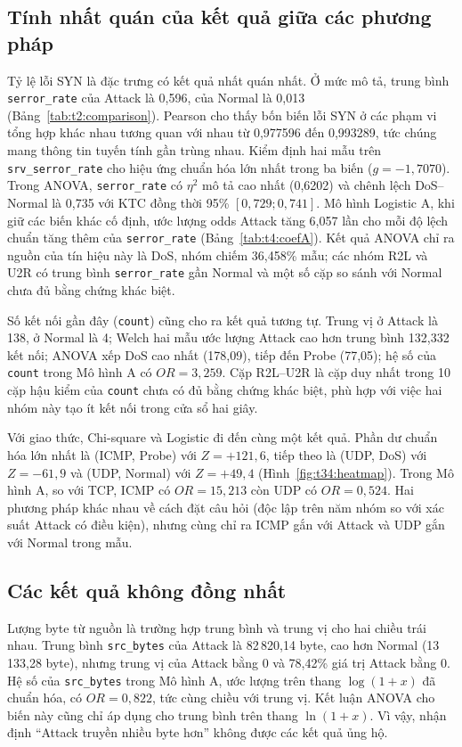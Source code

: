 \documentclass[../main.tex]{subfiles}
\begin{document}
\subsection{Tính nhất quán của kết quả giữa các phương pháp}
Tỷ lệ lỗi SYN là đặc trưng có kết quả nhất quán nhất. Ở mức mô tả, trung bình \texttt{serror\_rate} của Attack là 0,596, của Normal là 0,013 (Bảng~\ref{tab:t2:comparison}). Pearson cho thấy bốn biến lỗi SYN ở các phạm vi tổng hợp khác nhau tương quan với nhau từ 0,977596 đến 0,993289, tức chúng mang thông tin tuyến tính gần trùng nhau. Kiểm định hai mẫu trên \texttt{srv\_serror\_rate} cho hiệu ứng chuẩn hóa lớn nhất trong ba biến ($g=-1{,}7070$). Trong ANOVA, \texttt{serror\_rate} có $\eta^2$ mô tả cao nhất (0,6202) và chênh lệch DoS--Normal là 0,735 với KTC đồng thời 95\% $[0{,}729;0{,}741]$. Mô hình Logistic A, khi giữ các biến khác cố định, ước lượng odds Attack tăng 6,057 lần cho mỗi độ lệch chuẩn tăng thêm của \texttt{serror\_rate} (Bảng~\ref{tab:t4:coefA}). Kết quả ANOVA chỉ ra nguồn của tín hiệu này là DoS, nhóm chiếm 36,458\% mẫu; các nhóm R2L và U2R có trung bình \texttt{serror\_rate} gần Normal và một số cặp so sánh với Normal chưa đủ bằng chứng khác biệt.

Số kết nối gần đây (\texttt{count}) cũng cho ra kết quả tương tự. Trung vị ở Attack là 138, ở Normal là 4; Welch hai mẫu ước lượng Attack cao hơn trung bình 132,332 kết nối; ANOVA xếp DoS cao nhất (178,09), tiếp đến Probe (77,05); hệ số của \texttt{count} trong Mô hình A có $OR=3{,}259$. Cặp R2L--U2R là cặp duy nhất trong 10 cặp hậu kiểm của \texttt{count} chưa có đủ bằng chứng khác biệt, phù hợp với việc hai nhóm này tạo ít kết nối trong cửa sổ hai giây.

Với giao thức, Chi-square và Logistic đi đến cùng một kết quả. Phần dư chuẩn hóa lớn nhất là (ICMP, Probe) với $Z=+121{,}6$, tiếp theo là (UDP, DoS) với $Z=-61{,}9$ và (UDP, Normal) với $Z=+49{,}4$ (Hình~\ref{fig:t34:heatmap}). Trong Mô hình A, so với TCP, ICMP có $OR=15{,}213$ còn UDP có $OR=0{,}524$. Hai phương pháp khác nhau về cách đặt câu hỏi (độc lập trên năm nhóm so với xác suất Attack có điều kiện), nhưng cùng chỉ ra ICMP gắn với Attack và UDP gắn với Normal trong mẫu.

\subsection{Các kết quả không đồng nhất}
Lượng byte từ nguồn là trường hợp trung bình và trung vị cho hai chiều trái nhau. Trung bình \texttt{src\_bytes} của Attack là 82\,820,14 byte, cao hơn Normal (13\,133,28 byte), nhưng trung vị của Attack bằng 0 và 78,42\% giá trị Attack bằng 0. Hệ số của \texttt{src\_bytes} trong Mô hình A, ước lượng trên thang $\log(1+x)$ đã chuẩn hóa, có $OR=0{,}822$, tức cùng chiều với trung vị. Kết luận ANOVA cho biến này cũng chỉ áp dụng cho trung bình trên thang $\ln(1+x)$. Vì vậy, nhận định ``Attack truyền nhiều byte hơn'' không được các kết quả ủng hộ.
\end{document}
